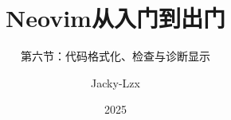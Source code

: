 \documentclass[17pt]{ctexbeamer}
\title{Neovim从入门到出门}
\subtitle{第六节：代码格式化、检查与诊断显示}
\author{Jacky-Lzx}
\date{2025}
\begin{document}
\begin{frame}
  \titlepage
\end{frame}
\end{document}
